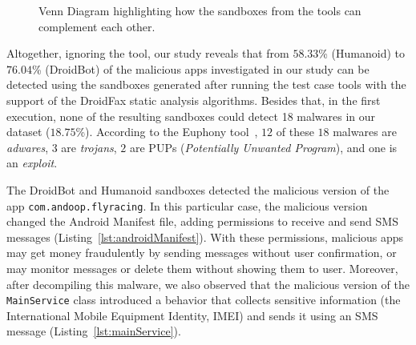 \begin{figure}[htb]
  \caption{Venn Diagram highlighting how the sandboxes from the tools can
    complement each other.}
  \label{fig:venn-plot1}
\end{figure}


Altogether, ignoring the \joke tool, our study reveals that from $58.33$\% (Humanoid)
to $76.04$\% (DroidBot) of the malicious apps investigated in our study can be
detected using the sandboxes generated after running the test case tools with the support of the
DroidFax static analysis algorithms. Besides that, in the first execution, none of the
resulting sandboxes could detect 18 malwares in our dataset ($18.75$\%). According to
the Euphony tool~\cite{hurier2017euphony}, $12$ of these $18$ malwares are \emph{adwares}, $3$ are \emph{trojans}, $2$ are
PUPs (\emph{Potentially Unwanted Program}), and one is an \emph{exploit}.

The DroidBot and Humanoid sandboxes detected the malicious version of the app \texttt{com.andoop.flyracing}. In this particular case, the malicious version changed the Android Manifest file, adding permissions to receive and send SMS messages
(Listing~\ref{lst:androidManifest}). With these permissions, malicious apps may get money fraudulently by sending messages without user confirmation, or may monitor messages or delete them without showing them to user.  Moreover, after decompiling this malware, we also observed that the malicious version of the
\texttt{MainService} class introduced a
behavior that collects sensitive information (the International Mobile
Equipment Identity, IMEI) and sends it using an SMS message
(Listing~\ref{lst:mainService}). 

